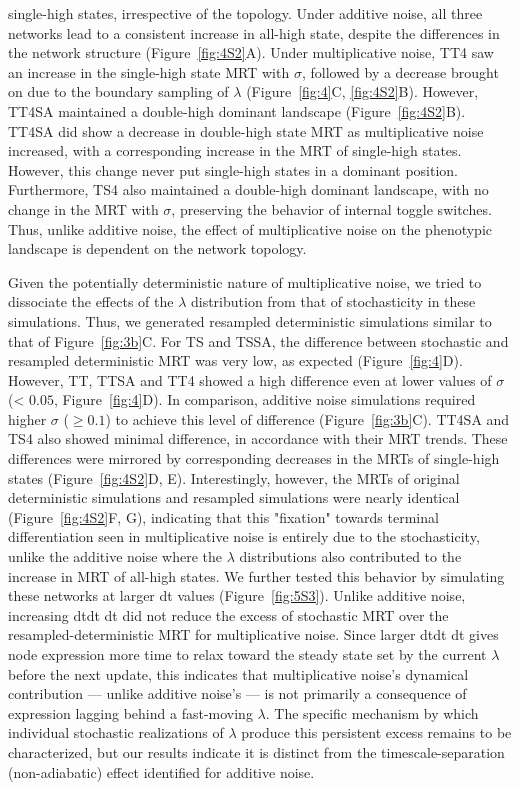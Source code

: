 \documentclass[11pt]{article}
\begin{document}
single-high states, irrespective of the topology. Under additive noise, all three networks lead to a consistent increase in all-high state, despite the differences in the network structure (Figure~\ref{fig:4S2}A). Under multiplicative noise, TT4 saw an increase in the single-high state MRT with $\sigma$, followed by a decrease brought on due to the boundary sampling of $\lambda$ (Figure~\ref{fig:4}C, \ref{fig:4S2}B). However, TT4SA maintained a double-high dominant landscape (Figure~\ref{fig:4S2}B). TT4SA did show a decrease in double-high state MRT as multiplicative noise increased, with a corresponding increase in the MRT of single-high states. However, this change never put single-high states in a dominant position. Furthermore, TS4 also maintained a double-high dominant landscape, with no change in the MRT with $\sigma$, preserving the behavior of internal toggle switches. Thus, unlike additive noise, the effect of multiplicative noise on the phenotypic landscape is dependent on the network topology. 

Given the potentially deterministic nature of multiplicative noise, we tried to dissociate the effects of the $\lambda$ distribution from that of stochasticity in these simulations. Thus, we generated resampled deterministic simulations similar to that of Figure~\ref{fig:3b}C. For TS and TSSA, the difference between stochastic and resampled deterministic MRT was very low, as expected (Figure~\ref{fig:4}D). However, TT, TTSA and TT4 showed a high difference even at lower values of $\sigma$ (< $0.05$, Figure~\ref{fig:4}D). In comparison, additive noise simulations required higher  $\sigma$ ($\geq 0.1$) to achieve this level of difference (Figure~\ref{fig:3b}C). TT4SA and TS4 also showed minimal difference, in accordance with their MRT trends. These differences were mirrored by corresponding decreases in the MRTs of single-high states (Figure~\ref{fig:4S2}D, E). Interestingly, however, the MRTs of original deterministic simulations and resampled simulations were nearly identical (Figure~\ref{fig:4S2}F, G), indicating that this "fixation" towards terminal differentiation seen in multiplicative noise is entirely due to the stochasticity, unlike the additive noise where the $\lambda$ distributions also contributed to the increase in MRT of all-high states. We further tested this behavior by simulating these networks at larger dt values (Figure~\ref{fig:5S3}). Unlike additive noise, increasing dtdt dt did not reduce the excess of stochastic MRT over the resampled-deterministic MRT for multiplicative noise. Since larger dtdt dt gives node expression more time to relax toward the steady state set by the current $\lambda$ before the next update, this indicates that multiplicative noise's dynamical contribution — unlike additive noise's — is not primarily a consequence of expression lagging behind a fast-moving $\lambda$. The specific mechanism by which individual stochastic realizations of $\lambda$ produce this persistent excess remains to be characterized, but our results indicate it is distinct from the timescale-separation (non-adiabatic) effect identified for additive noise.
\end{document}
